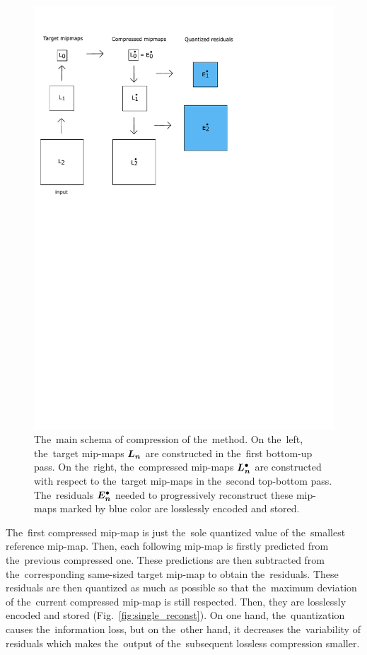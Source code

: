 \begin{figure}
	\includegraphics[trim={0 15cm 6cm 1cm}, clip, width=1\textwidth]{figures/main_schema.pdf}\centering
	\caption{The~main schema of compression of the~method. On the~left, the~target mip-maps $\lnorm{n}$ are constructed in the~first bottom-up pass. On the~right, the~compressed mip-maps $\ldot{n}$ are constructed with respect to the~target mip-maps in the~second top-bottom pass. The~residuals $\objdot{E}{n}$ needed to progressively reconstruct these mip-maps marked by blue color are losslessly encoded and stored.}
	\label{fig:main_schema}
\end{figure}

The~first compressed mip-map is just the~sole quantized value of the~smallest reference mip-map. Then, each following mip-map is firstly predicted from the~previous compressed one. These predictions are then subtracted from the~corresponding same-sized target mip-map to obtain the~residuals. These residuals are then quantized as much as possible so that the~maximum deviation of the~current compressed mip-map is still respected. Then, they are losslessly encoded and stored (Fig.~\ref{fig:single_reconst}). On one hand, the~quantization causes the~information loss, but on the~other hand, it decreases the~variability of residuals which makes the~output of the~subsequent lossless compression smaller. 

